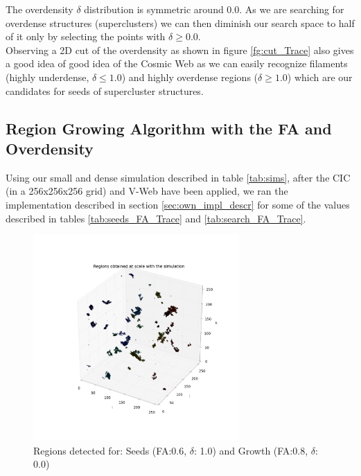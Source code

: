 \documentclass[12pt]{article}
\begin{document}
\begin{par}
The overdensity $\delta$ distribution is symmetric
 around 0.0. As we are searching for overdense
  structures (superclusters) we can then diminish
   our search space to half of it only by
    selecting the points with $\delta \geq 0.0$. \\
Observing a 2D cut of the overdensity as shown in
 figure \ref{fg:cut_Trace} also gives a good idea
  of good idea of the Cosmic Web as we can easily
   recognize filaments (highly underdense, $\delta
    \leq 1.0$) and highly overdense regions
     ($\delta \geq 1.0$) which are our candidates
      for seeds of supercluster structures.
\end{par}



\subsection{Region Growing Algorithm with the FA and Overdensity}
\begin{par}
Using our small and dense simulation described in
 table \ref{tab:sims}, after the CIC (in a
  256x256x256 grid) and V-Web have been applied,
   we ran the implementation described in section
    \ref{sec:own_impl_descr} for some of the
     values described in tables
      \ref{tab:seeds_FA_Trace} and
       \ref{tab:search_FA_Trace}. 
\end{par}

\begin{figure}[ht]
\begin{center}
\includegraphics[width=0.7\textwidth]{groups/firstimplementation/regions_3D_129.png} %
\caption{Regions detected for: Seeds (FA:0.6, $\delta$: 1.0) and Growth (FA:0.8, $\delta$: 0.0) }
\label{fg:first_3D_all}
\end{center}
\end{figure}
\FloatBarrier
\end{document}
